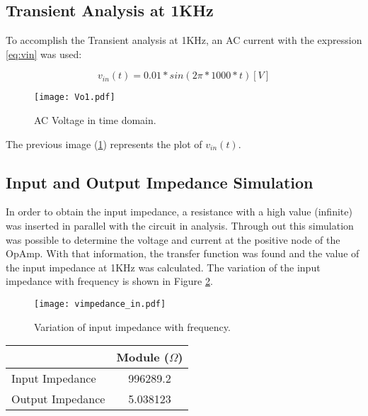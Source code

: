 \subsection{Transient Analysis at 1KHz}

To accomplish the Transient analysis at 1KHz, an AC current with the expression \ref{eq:vin} was used:

\begin{equation}
    v_{in}(t) = 0.01 * sin ( 2\pi * 1000 * t)   [V]
\label{eq:vin}
\end{equation} 

\begin{figure}[h] \centering
\texttt{[image: Vo1.pdf]}
\caption{AC Voltage in time domain.}
\label{fig:envelope}
\end{figure}
\newpage
The previous image (\ref{fig:envelope}) represents the plot of $v_{in}(t)$.

\subsection{Input and Output Impedance Simulation}

In order to obtain the input impedance, a resistance with a high value (infinite) was inserted in parallel with the circuit in analysis. Through out this simulation was possible to determine the voltage and current at the positive node of the OpAmp. With that information, the transfer function was found and the value of the input impedance at 1KHz was calculated. The variation of the input impedance with frequency is shown in Figure \ref{fig:vimpedance_in}.

\begin{figure}[h] \centering
\texttt{[image: vimpedance\_in.pdf]}
\caption{Variation of input impedance with frequency.}
\label{fig:vimpedance_in}
\end{figure}

\newpage

\begin{table}[h]
 \centering
  \begin{tabular}{|l|c|}
   \hline
   \multicolumn{1}{|c|}{} & Module ($\Omega$) \\ \hline
    Input Impedance        & 996289.2                        \\ \hline
    Output Impedance       & 5.038123                       \\ \hline
\end{tabular}
\end{table}

